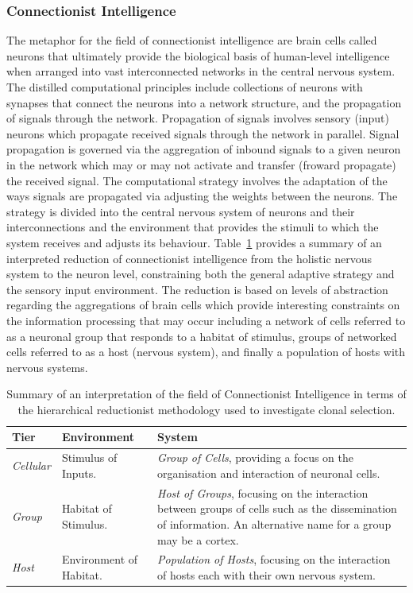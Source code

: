 \subsubsection{Connectionist Intelligence}
The metaphor for the field of connectionist intelligence are brain cells called neurons that ultimately provide the biological basis of human-level intelligence when arranged into vast interconnected networks in the central nervous system.
The distilled computational principles include collections of neurons with synapses that connect the neurons into a network structure, and the propagation of signals through the network. Propagation of signals involves sensory (input) neurons which propagate received signals through the network in parallel. Signal propagation is governed via the aggregation of inbound signals to a given neuron in the network which may or may not activate and transfer (froward propagate) the received signal. The computational strategy involves the adaptation of the ways signals are propagated via adjusting the weights between the neurons. 
The strategy is divided into the central nervous system of neurons and their interconnections and the environment that provides the stimuli to which the system receives and adjusts its behaviour. 
Table~\ref{tab:framework:other:ann} provides a summary of an interpreted reduction of connectionist intelligence from the holistic nervous system to the neuron level, constraining both the general adaptive strategy and the sensory input environment.
The reduction is based on levels of abstraction regarding the aggregations of brain cells which provide interesting constraints on the information processing that may occur including a network of cells referred to as a neuronal group that responds to a habitat of stimulus, groups of networked cells referred to as a host (nervous system), and finally a population of hosts with nervous systems.

\begin{table}[htp]
	\centering\small
		\begin{tabularx}{\textwidth}{llX}
		\toprule
		\textbf{Tier} & \textbf{Environment} & \textbf{System} \\ 
		\toprule	
		\emph{Cellular} & Stimulus of Inputs. & \emph{Group of Cells}, providing a focus on the organisation and interaction of neuronal cells. \\ 
		\midrule
		\emph{Group} & Habitat of Stimulus. & \emph{Host of Groups}, focusing on the interaction between groups of cells such as the dissemination of information. An alternative name for a group may be a cortex. \\ 
		\midrule
		\emph{Host} & Environment of Habitat. & \emph{Population of Hosts}, focusing on the interaction of hosts each with their own nervous system. \\ 
		\bottomrule
		\end{tabularx}
	\caption{Summary of an interpretation of the field of Connectionist Intelligence in terms of the hierarchical reductionist methodology used to investigate clonal selection.}
	\label{tab:framework:other:ann}
\end{table}

